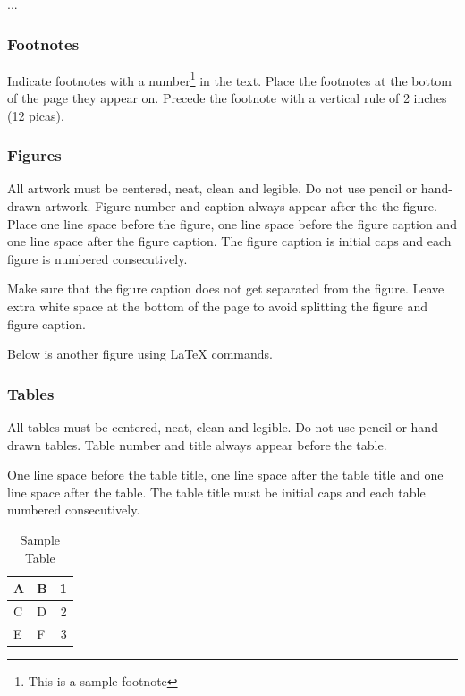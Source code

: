 \documentclass[a4paper]{article}
\begin{document}
...

\subsubsection{Footnotes}

Indicate footnotes with a number\footnote{This is a sample footnote} in
the text. Place the footnotes at the bottom of the page they appear on.
Precede the footnote with a vertical rule of 2 inches (12 picas).

\subsubsection{Figures}

All artwork must be centered, neat, clean and legible. Do not use pencil
or hand-drawn artwork. Figure number and caption always appear after the
the figure. Place one line space before the figure, one line space
before the figure caption and one line space after the figure caption.
The figure caption is initial caps and each figure is numbered
consecutively.

Make sure that the figure caption does not get separated from the
figure. Leave extra white space at the bottom of the page to avoid
splitting the figure and figure caption.

Below is another figure using LaTeX commands.



\subsubsection{Tables}

All tables must be centered, neat, clean and legible. Do not use pencil
or hand-drawn tables. Table number and title always appear before the
table.

One line space before the table title, one line space after the table
title and one line space after the table. The table title must be
initial caps and each table numbered consecutively.

\begin{table}[ht]
\begin{center}
\caption{Sample Table}

\bigskip

\begin{tabular}{|l|l|r|}
\hline
A & B & 1\\ \hline
C & D & 2\\
E & F & 3\\ \hline
\end{tabular}
\end{center}
\end{table}
\end{document}
